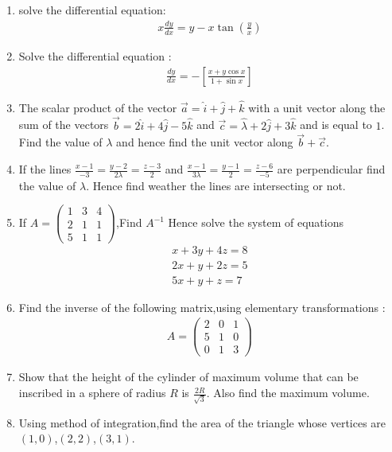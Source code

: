 \documentclass[12pt,-letter paper]{article}
\providecommand{\sbrak}[1]{\ensuremath{{}\left[#1\right]}}
\providecommand{\brak}[1]{\ensuremath{\left(#1\right)}}
\theoremstyle{remark}
\newcommand{\myvec}[1]{\ensuremath{\begin{pmatrix}#1\end{pmatrix}}}
\begin{document}
\begin{enumerate}
\item solve the differential equation: \begin{align*}{x}\frac{dy}{dx}= {y}-{x}\tan\brak{\frac{y}{x}}\end{align*}

\item Solve the differential equation : \begin{align*}\frac{dy}{dx}= -\sbrak{\frac{x+y\cos x}{1+\sin x}}\end{align*}

\item The scalar product of the vector $\overrightarrow{a} = \hat{i}+\hat{j}+\hat{k}$ with a unit vector along the sum of the vectors $\overrightarrow{b} = 2\hat{i}+4\hat{j}-5\hat{k}$ and $\overrightarrow{c} = \hat{\lambda}+2\hat{j}+3\hat{k}$ and is equal to $1$. Find the value of $\lambda$ and hence find the unit vector along $\overrightarrow{b}+\overrightarrow{c}$.

\item If the lines $\frac{x-1}{-3}=\frac{y-2}{2\lambda}=\frac{z-3}{2}$ and $\frac{x-1}{3\lambda}=\frac{y-1}{2}=\frac{z-6}{-5}$ are perpendicular find the value of $\lambda$. Hence find weather the lines are intersecting or not.

\item If ${A} = \myvec{1&3&4\\2&1&1\\5&1&1}$,Find $A^{-1}$
        Hence solve the system of equations 
            \begin{align*}
                {x+3y+4z}=8 \\
                {2x+y+2z}=5 \\
                {5x+y+z} =7
            \end{align*}    
                
        \item Find the inverse of the following matrix,using elementary transformations :
                \begin{align*}{A} = \myvec{2&0&1\\5&1&0\\ 0&1&3}\end{align*}
                
        \item Show that the height of the cylinder of maximum volume that can be inscribed in a sphere of radius $R$ is $\frac{2R}{\sqrt{3}}$. Also find the maximum volume.
        
        \item Using method of integration,find the area of the triangle whose vertices are $\brak{1,0}$,$\brak{2,2}$,$\brak{3,1}$.
        

\end{enumerate}
\end{document}
